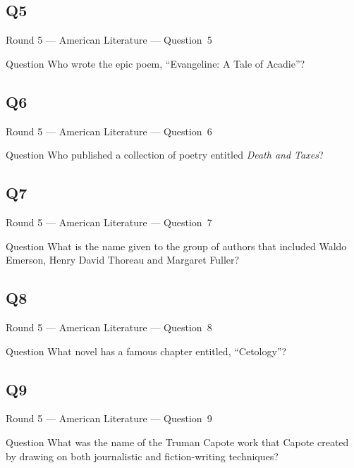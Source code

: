 \documentclass[11pt]{beamer}
\begin{document}
\subsection*{Q5}
\begin{frame}[t]{Round 5 --- American Literature --- \mbox{Question 5}}
\vspace{-0.5em}
\begin{block}{Question}
Who wrote the epic poem, ``Evangeline: A Tale of Acadie''?
\end{block}
\end{frame}
\subsection*{Q6}
\begin{frame}[t]{Round 5 --- American Literature --- \mbox{Question 6}}
\vspace{-0.5em}
\begin{block}{Question}
Who published a collection of poetry entitled \emph{Death and Taxes}?
\end{block}
\end{frame}
\subsection*{Q7}
\begin{frame}[t]{Round 5 --- American Literature --- \mbox{Question 7}}
\vspace{-0.5em}
\begin{block}{Question}
What is the name given to the group of authors that included Waldo Emerson, Henry David Thoreau and Margaret Fuller?
\end{block}
\end{frame}
\subsection*{Q8}
\begin{frame}[t]{Round 5 --- American Literature --- \mbox{Question 8}}
\vspace{-0.5em}
\begin{block}{Question}
What novel has a famous chapter entitled, ``Cetology''?
\end{block}
\end{frame}
\subsection*{Q9}
\begin{frame}[t]{Round 5 --- American Literature --- \mbox{Question 9}}
\vspace{-0.5em}
\begin{block}{Question}
What was the name of the Truman Capote work that Capote created by drawing on both journalistic and fiction-writing techniques?
\end{block}
\end{frame}
\end{document}
